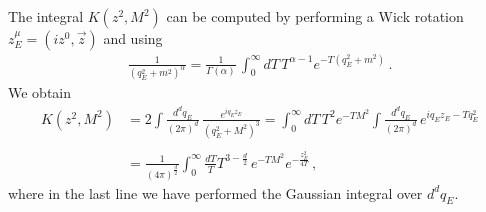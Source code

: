 The integral $K\left(z^2, M^2\right)$ can be computed by performing a Wick rotation $z_E^\mu = \left(iz^0,\vec{z}\right)$
and using
\begin{align}
        \frac{1}{\left(q_E^2+m^2\right)^{\alpha}} = 
        \frac{1}{\Gamma\left(\alpha\right)}\, 
        \int_0^{\infty} dT \, T^{\alpha-1} e^{-T\left(q_E^2+m^2\right)}\, .
\end{align}
We obtain
\begin{align}
\label{eq::kernel}
        K\left(z^2, M^2\right) 
        &= 2\int \frac{d^dq_E}{\left(2\pi\right)^d}\, 
        \frac{e^{i q_E z_E}}{\left(q_E^2+M^2\right)^3} 
        = \int_0^{\infty} dT\, T^2 e^{-T M^2} 
        \int \frac{d^dq_E}{\left(2\pi\right)^d}\, 
        e^{i q_E z_E -T q_E^2} \nonumber\\ \nonumber\\
        &= \frac{1}{\left(4\pi\right)^\frac{d}{2}} 
        \int_0^{\infty}\frac{dT}{T}T^{3-\frac{d}{2}}\, 
        e^{-TM^2} e^{-\frac{z_E^2}{4T}}\, ,
\end{align}
where in the last line we have performed the Gaussian integral over $d^{d}q_E$.

